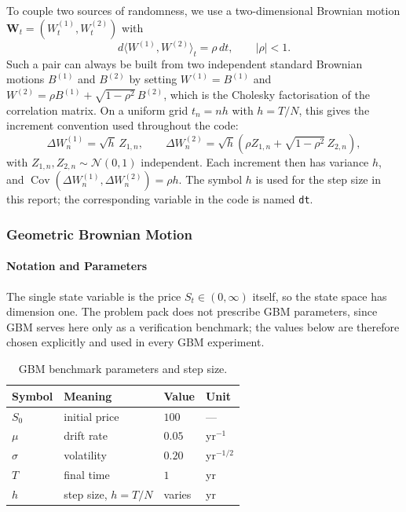 \documentclass[11pt,a4paper]{article}
\theoremstyle{definition}
\theoremstyle{remark}
\begin{document}
To couple two sources of randomness, we use a two-dimensional Brownian motion
$\bm{W}_t = (W_t^{(1)}, W_t^{(2)})$ with
\begin{equation}
    d\langle W^{(1)}, W^{(2)} \rangle_t = \rho\, dt,
    \qquad |\rho| < 1 .
    \label{eq:correlation}
\end{equation}
Such a pair can always be built from two independent standard Brownian motions
$B^{(1)}$ and $B^{(2)}$ by setting
$W^{(1)} = B^{(1)}$ and $W^{(2)} = \rho B^{(1)} + \sqrt{1 - \rho^2}\, B^{(2)}$,
which is the Cholesky factorisation of the correlation matrix. On a uniform
grid $t_n = n h$ with $h = T / N$, this gives the increment convention used
throughout the code:
\begin{equation}
    \Delta W_n^{(1)} = \sqrt{h}\, Z_{1,n},
    \qquad
    \Delta W_n^{(2)} = \sqrt{h}\left( \rho Z_{1,n}
                       + \sqrt{1 - \rho^2}\, Z_{2,n} \right),
    \label{eq:increments}
\end{equation}
with $Z_{1,n}, Z_{2,n} \sim \mathcal{N}(0, 1)$ independent. Each increment then
has variance $h$, and
$\operatorname{Cov}\!\left( \Delta W_n^{(1)}, \Delta W_n^{(2)} \right) = \rho h$.
The symbol $h$ is used for the step size in this report; the corresponding
variable in the code is named \texttt{dt}.

\subsubsection{Geometric Brownian Motion}
\label{sec:gbm-model}

\paragraph{Notation and Parameters}
The single state variable is the price $S_t \in (0, \infty)$ itself, so the
state space has dimension one. The problem pack does not prescribe GBM
parameters, since GBM serves here only as a verification benchmark; the values
below are therefore chosen explicitly and used in every GBM experiment.

\begin{table}[H]
\centering
\begin{tabular}{llll}
\toprule
\textbf{Symbol} & \textbf{Meaning} & \textbf{Value} & \textbf{Unit} \\
\midrule
$S_0$    & initial price        & $100$   & --- \\
$\mu$    & drift rate           & $0.05$  & yr$^{-1}$ \\
$\sigma$ & volatility           & $0.20$  & yr$^{-1/2}$ \\
$T$      & final time           & $1$     & yr \\
$h$      & step size, $h = T/N$ & varies  & yr \\
\bottomrule
\end{tabular}
\caption{GBM benchmark parameters and step size.}
\label{tab:gbm-params}
\end{table}
\end{document}
